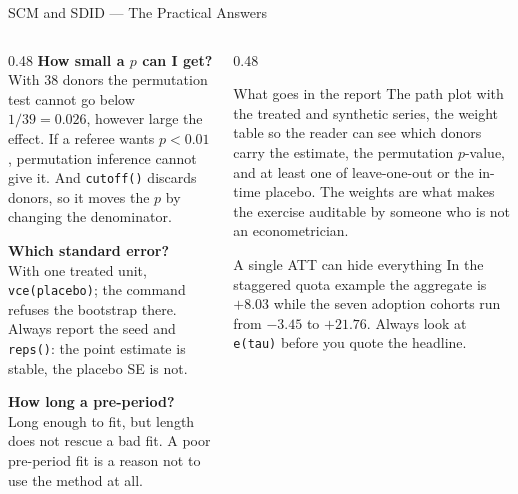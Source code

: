 \documentclass[main.tex]{subfiles}
\begin{document}
\begin{frame}{SCM and SDID --- The Practical Answers}

  \begin{columns}[T]
    \begin{column}{0.48\textwidth}
      \textbf{How small a $p$ can I get?}\\
      \footnotesize With 38 donors the permutation test cannot go below
      $1/39 = 0.026$, however large the effect. If a referee wants
      $p < 0.01$, permutation inference cannot give it. And
      \texttt{cutoff()} discards donors, so it moves the $p$ by changing the
      denominator.

      \medskip
      \normalsize\textbf{Which standard error?}\\
      \footnotesize With one treated unit, \texttt{vce(placebo)}; the command
      refuses the bootstrap there. Always report the seed and \texttt{reps()}:
      the point estimate is stable, the placebo SE is not.

      \medskip
      \normalsize\textbf{How long a pre-period?}\\
      \footnotesize Long enough to fit, but length does not rescue a bad fit.
      A poor pre-period fit is a reason not to use the method at all.
    \end{column}
    \begin{column}{0.48\textwidth}
      \begin{block}{\footnotesize What goes in the report}
        \footnotesize
        The path plot with the treated and synthetic series, the weight table so
        the reader can see which donors carry the estimate, the permutation
        $p$-value, and at least one of leave-one-out or the in-time placebo.
        The weights are what makes the exercise auditable by someone who is not
        an econometrician.
      \end{block}

      \smallskip
      \begin{alertblock}{\footnotesize A single ATT can hide everything}
        \footnotesize
        In the staggered quota example the aggregate is $+8.03$ while the seven
        adoption cohorts run from $-3.45$ to $+21.76$. Always look at
        \texttt{e(tau)} before you quote the headline.
      \end{alertblock}
    \end{column}
  \end{columns}

\end{frame}
\end{document}
